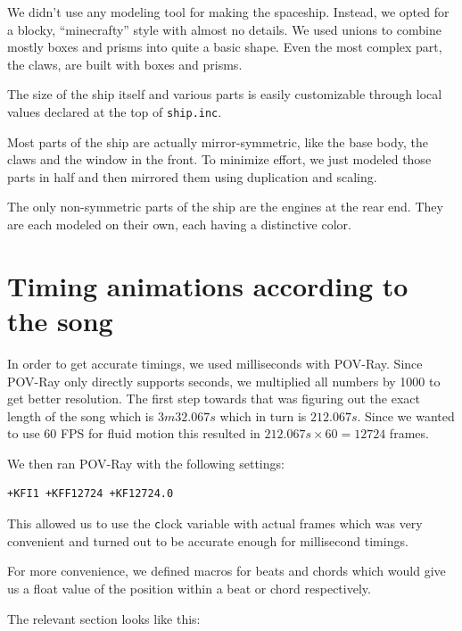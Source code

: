 \documentclass[a4paper, 12pt]{scrartcl}
\begin{document}
    We didn't use any modeling tool for making the spaceship. Instead, we opted for a blocky, ``minecrafty'' style with almost no details. We used unions to combine mostly boxes and prisms into quite a basic shape. Even the most complex part, the claws, are built with boxes and prisms.

    The size of the ship itself and various parts is easily customizable through local values declared at the top of \texttt{ship.inc}.

    Most parts of the ship are actually mirror-symmetric, like the base body, the claws and the window in the front. To minimize effort, we just modeled those parts in half and then mirrored them using duplication and scaling.

    The only non-symmetric parts of the ship are the engines at the rear end. They are each modeled on their own, each having a distinctive color.

    \section{Timing animations according to the song}

    In order to get accurate timings, we used milliseconds with POV-Ray. Since POV-Ray only
    directly supports seconds, we multiplied all numbers by 1000 to get better resolution.
    The first step towards that was figuring out the exact length of the song which is
    \(3m32.067s\) which in turn is \(212.067s\). Since we wanted to use 60 FPS for fluid motion
    this resulted in \(212.067s \times 60 = 12724\) frames. 

    We then ran POV-Ray with the following settings:
    \begin{verbatim}+KFI1 +KFF12724 +KF12724.0\end{verbatim}
    This allowed us to use the \texttt clock variable with actual frames which was very convenient
    and turned out to be accurate enough for millisecond timings.

    For more convenience, we defined macros for beats and chords which would give us a float value
    of the position within a beat or chord respectively.

    The relevant section looks like this:
\end{document}

